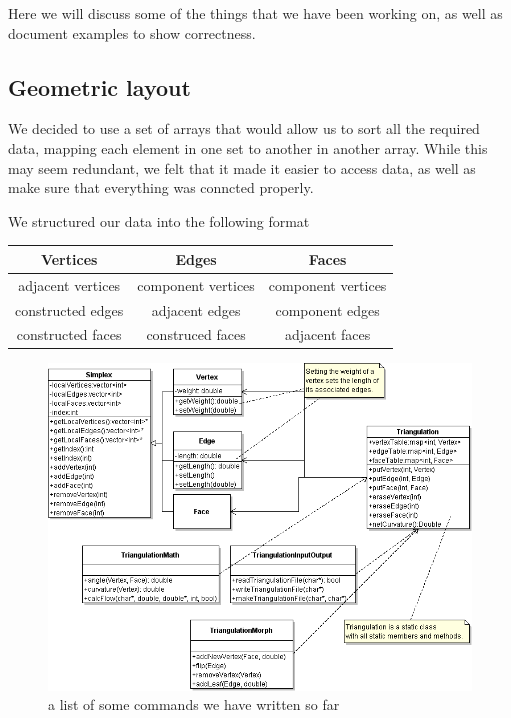 \documentclass[12pt]{article}
\begin{document}
  Here we will discuss some of the things that we have been working on, as well as document examples to show correctness.
  
  \subsection{Geometric layout}
  \maketitle
  
  We decided to use a set of arrays that would allow us to sort all the required data, mapping each element in one set to another in another array. While this may seem redundant, we felt that it made it easier to access data, as well as make sure that everything was conncted properly.\newline
  
  We structured our data into the following format\newline
  
  \begin{center}
  \begin{tabular}{|c|c|c|}
  \hline
  Vertices & Edges & Faces\\
  \hline
  adjacent vertices & component vertices & component vertices\\
  constructed edges & adjacent edges & component edges\\
  constructed faces & construced faces & adjacent faces\\
  \hline
  \end{tabular}
  \end{center}
  
\begin{figure}
\includegraphics[scale = 0.5]{triangulationUML.png}
\caption{a list of some commands we have written so far}
\end{figure}
\end{document}
